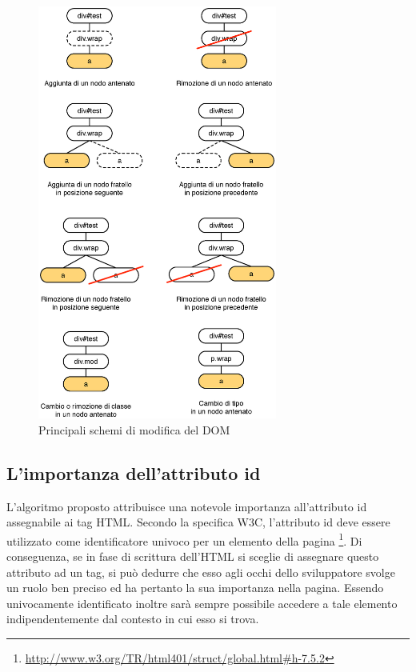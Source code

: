 \begin{figure}[htbp]
\begin{center}
\includegraphics[width=0.7\textwidth]{images/dom_mod.eps}
\caption{Principali schemi di modifica del DOM}
\label{fig:domMod}
\end{center}
\end{figure}

\subsection {L'importanza dell'attributo id}

L'algoritmo proposto attribuisce una notevole importanza all'attributo id assegnabile ai tag HTML. Secondo la specifica W3C, l'attributo id deve essere utilizzato come identificatore univoco per un elemento della pagina \footnote{\url{http://www.w3.org/TR/html401/struct/global.html\#h-7.5.2}}. Di conseguenza, se in fase di scrittura dell'HTML si sceglie di assegnare questo attributo ad un tag, si può dedurre che esso agli occhi dello sviluppatore svolge un ruolo ben preciso ed ha pertanto la sua importanza nella pagina. Essendo univocamente identificato inoltre sarà sempre possibile accedere a tale elemento indipendentemente dal contesto in cui esso si trova. 

